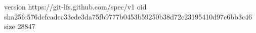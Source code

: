 version https://git-lfs.github.com/spec/v1
oid sha256:576dcfcadcc33ede3da75fb9777b0453b59250b38d72c23195410d97c6bb3c46
size 28847
